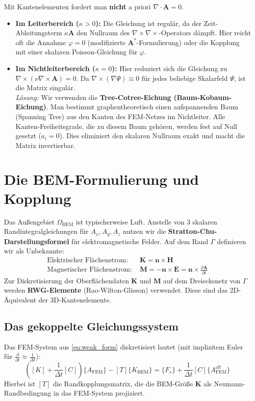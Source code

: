 \documentclass[11pt,a4paper]{article}
\newcommand{\vA}{\bm{A}}
\newcommand{\vH}{\bm{H}}
\newcommand{\vE}{\bm{E}}
\newcommand{\vn}{\bm{n}}
\newcommand{\vK}{\bm{K}} %
\newcommand{\vM}{\bm{M}} %
\newcommand{\rot}{\nabla \times}
\newcommand{\grad}{\nabla}
\renewcommand{\div}{\nabla \cdot}
\begin{document}
Mit Kantenelementen fordert man \textbf{nicht} a priori $\div \vA = 0$. 
\begin{itemize}
    \item \textbf{Im Leiterbereich ($\kappa > 0$):} Die Gleichung ist regulär, da der Zeit-Ableitungsterm $\kappa \dot{\vA}$ den Nullraum des $\rot \rot$-Operators dämpft. Hier reicht oft die Annahme $\varphi=0$ (modifizierte $\vA^*$-Formulierung) oder die Kopplung mit einer skalaren Poisson-Gleichung für $\varphi$.
    \item \textbf{Im Nichtleiterbereich ($\kappa = 0$):} Hier reduziert sich die Gleichung zu $\rot (\nu \rot \vA) = 0$. Da $\rot (\grad \Psi) \equiv 0$ für jedes beliebige Skalarfeld $\Psi$, ist die Matrix singulär. \\
    \textit{Lösung:} Wir verwenden die \textbf{Tree-Cotree-Eichung (Baum-Kobaum-Eichung)}. Man bestimmt graphentheoretisch einen aufspannenden Baum (Spanning Tree) aus den Kanten des FEM-Netzes im Nichtleiter. Alle Kanten-Freiheitsgrade, die zu diesem Baum gehören, werden fest auf Null gesetzt ($a_i = 0$). Dies eliminiert den skalaren Nullraum exakt und macht die Matrix invertierbar.
\end{itemize}

\section{Die BEM-Formulierung und Kopplung}

Das Außengebiet $\Omega_{\text{BEM}}$ ist typischerweise Luft. Anstelle von 3 skalaren Randintegralgleichungen für $A_x, A_y, A_z$ nutzen wir die \textbf{Stratton-Chu-Darstellungsformel} für elektromagnetische Felder. 
Auf dem Rand $\Gamma$ definieren wir als Unbekannte:
\begin{align}
    \text{Elektrischer Flächenstrom: } & \vK = \vn \times \vH \\
    \text{Magnetischer Flächenstrom: } & \vM = -\vn \times \vE = \vn \times \frac{\partial \vA}{\partial t}
\end{align}
Zur Diskretisierung der Oberflächendaten $\vK$ und $\vM$ auf dem Dreiecksnetz von $\Gamma$ werden \textbf{RWG-Elemente} (Rao-Wilton-Glisson) verwendet. Diese sind das 2D-Äquivalent der 3D-Kantenelemente.

\subsection{Das gekoppelte Gleichungssystem}
Das FEM-System aus \eqref{eq:weak_form} diskretisiert lautet (mit implizitem Euler für $\frac{\partial}{\partial t} \approx \frac{1}{\Delta t}$):
\begin{equation}
    \left( [K] + \frac{1}{\Delta t}[C] \right) \{A_{\text{FEM}}\} - [T] \{K_{\text{BEM}}\} = \{F_s\} + \frac{1}{\Delta t}[C] \{A_{\text{FEM}}^{\text{alt}}\} \label{eq:fem_matrix}
\end{equation}
Hierbei ist $[T]$ die Randkopplungsmatrix, die die BEM-Größe $\vK$ als Neumann-Randbedingung in das FEM-System projiziert.
\end{document}
